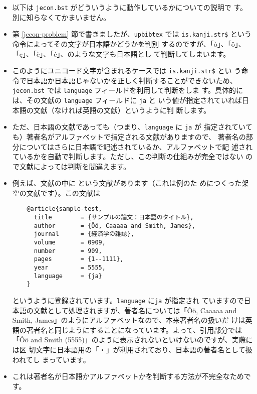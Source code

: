 \documentclass[a4paper,10pt]{bxjsarticle}
\begin{document}
\begin{itemize}
 \item 以下は \texttt{jecon.bst} がどういうように動作しているかについての説明で
       す。別に知らなくてかまいません。
 \item 第 \ref{jecon-problem} 節で書きましたが、\texttt{upbibtex} では
       \texttt{is.kanji.str\$} という命令によってその文字が日本語かどうかを判別
       するのですが、「ò」、「ö」、「ç」、「è」、「é」、のような文字も日本語とし
       て判断してしまいます。
 \item このようにユニコード文字が含まれるケースでは \texttt{is.kanji.str\$} とい
       う命令で日本語か日本語じゃないかを正しく判断することができないため、
       \texttt{jecon.bst} では \texttt{language} フィールドを利用して判断をしま
       す。具体的には、その文献の \texttt{language} フィールドに \texttt{ja} と
       いう値が指定されていれば日本語の文献（なければ英語の文献）というように判
       断します。
 \item ただ、日本語の文献であっても（つまり、\texttt{language} に \texttt{ja} が
       指定されていても）著者名がアルファベットで指定される文献がありますので、
       著者名の部分についてはさらに日本語で記述されているか、アルファベットで記
       述されているかを自動で判断します。ただし、この判断の仕組みが完全ではない
       ので文献によっては判断を間違えます。
 \item 例えば、文献の中に \citet{sample-test} という文献があります（これは例のた
       めにつくった架空の文献です）。この文献は
       \begin{verbatim}
    @article{sample-test,
      title        = {サンプルの論文：日本語のタイトル},
      author       = {Ôö, Caaaaa and Smith, James},
      journal      = {経済学の雑誌},
      volume       = 0909,
      number       = 909,
      pages        = {1--1111},
      year         = 5555,
      language     = {ja}
    }
       \end{verbatim}
       というように登録されています。\texttt{language} に\texttt{ja} が指定され
       ていますので日本語の文献として処理されますが、著者名については「Ôö,
       Caaaaa and Smith, James」のようにアルファベットなので、本来著者名の扱いだ
       けは英語の著者名と同じようにすることになっています。よって、引用部分では
       「Ôö and Smith (5555)」のように表示されないといけないのですが、実際には区
       切文字に日本語用の「・」が利用されており、日本語の著者名として扱われてし
       まっています。
 \item これは著者名が日本語かアルファベットかを判断する方法が不完全なためです。

\end{itemize}
\end{document}
